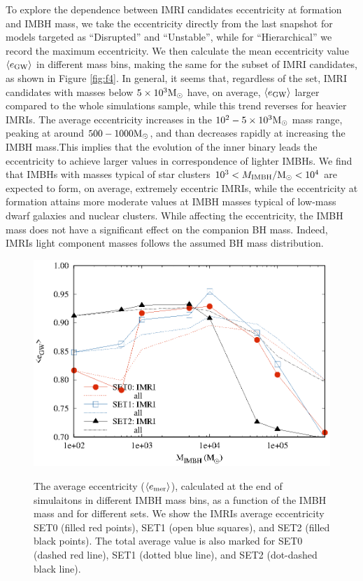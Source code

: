 \documentclass[twocolumn]{aastex62}
\newcommand{\Ms}{{\rm M}_\odot}
\newcommand{\gw}{{\rm GW}}
\newcommand{\ibh}{{\rm IMBH}}
\begin{document}
To explore the dependence between IMRI candidates eccentricity at formation and IMBH mass, we take the eccentricity directly from the last snapshot for models targeted as ``Disrupted'' and ``Unstable'', while for ``Hierarchical'' we record the maximum eccentricity. We then calculate the mean eccentricity value $\langle e_\gw\rangle$  in different mass bins, making the same for the subset of IMRI candidates, as shown in Figure \ref{fig:f4}. In general, it seems that, regardless of the set, IMRI candidates with masses below $5\times10^3\Ms$ have, on average, $\langle e_\gw\rangle$ larger compared to the whole simulations sample, while this trend reverses for heavier IMRIs. 
The average eccentricity increases in the $10^2-5\times10^3\Ms$ mass range, peaking at around $500-1000\Ms$, and than decreases rapidly at increasing the IMBH mass.This implies that the evolution of the inner binary leads the eccentricity to achieve larger values in correspondence of lighter IMBHs. We find that IMBHs with masses typical of star clusters $10^3<M_\ibh/\Ms<10^4$ are expected to form, on average, extremely eccentric IMRIs, while the eccentricity at formation attains more moderate values at IMBH masses typical of low-mass dwarf galaxies and nuclear clusters.
While affecting the eccentricity, the IMBH mass does not have a significant effect on the companion BH mass. Indeed, IMRIs light component masses follows the assumed BH mass distribution. 

\begin{figure}
\centering
\includegraphics[width=\columnwidth]{average_ecc_sets}\\
\caption{The average eccentricity ($\langle e_{\rm mer}\rangle$), calculated at the end of simulaitons in different IMBH mass bins, as a function of the IMBH mass and for different sets. We show the IMRIs average eccentricity SET0 (filled red points), SET1 (open blue squares), and SET2 (filled black points). The total average value is also marked for SET0 (dashed red line), SET1 (dotted blue line), and SET2 (dot-dashed black line). }
\label{fig:f5}
\end{figure}
\end{document}

